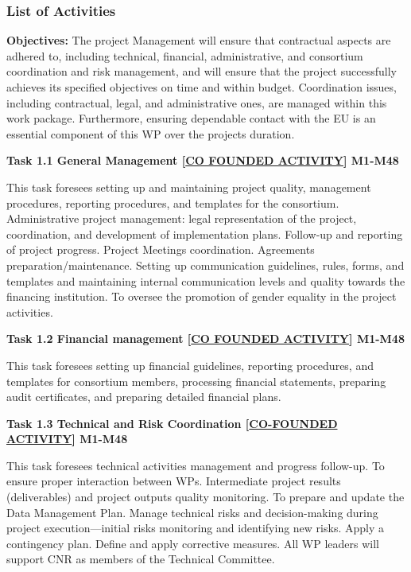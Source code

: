 \subsubsection{List of Activities}\label{list-of-activities}

\planactivityhead


\begin{planactivitybody}
\textbf{Objectives:} The project Management will ensure that
 contractual aspects are adhered to, including
technical, financial, administrative, and consortium coordination and
risk management, and will ensure that the project successfully achieves
its specified objectives on time and within budget. Coordination issues,
including contractual, legal, and administrative ones, are managed
within this work package. Furthermore, ensuring dependable contact with
the EU is an essential component of this WP over the
project\textquotesingle s duration.

\plantaskskip
\textbf{Task 1.1 General Management {[}\ul{CO FOUNDED ACTIVITY}{]}
M1-M48}

This task foresees setting up and maintaining project quality,
management procedures, reporting procedures, and templates for the
consortium. Administrative project management: legal representation of
the project, coordination, and development of implementation plans.
Follow-up and reporting of project progress. Project Meetings
coordination. Agreements preparation/maintenance. Setting up
communication guidelines, rules, forms, and templates and maintaining
internal communication levels and quality towards the financing
institution. To oversee the promotion of gender equality in the project
activities.

\plantaskskip
\textbf{Task 1.2 Financial management {[}\ul{CO FOUNDED ACTIVITY}{]}
M1-M48}

This task foresees setting up financial guidelines, reporting
procedures, and templates for consortium members, processing financial
statements, preparing audit certificates, and preparing detailed
financial plans.

\plantaskskip
\textbf{Task 1.3 Technical and Risk Coordination {[}\ul{CO-FOUNDED
ACTIVITY}{]} M1-M48}

This task foresees technical activities management and progress
follow-up. To ensure proper interaction between WPs. Intermediate
project results (deliverables) and project outputs quality monitoring.
To prepare and update the Data Management Plan. Manage technical risks
and decision-making during project execution---initial risks monitoring
and identifying new risks. Apply a contingency plan. Define and apply
corrective measures. All WP leaders will support CNR as members of the
Technical Committee.


\end{planactivitybody}
